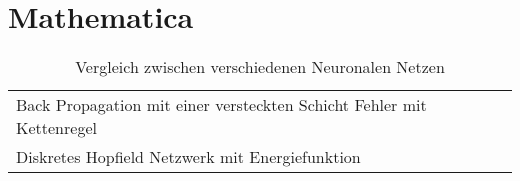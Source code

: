 \section{Mathematica}
\begin{table}[!h]
	\begin{tabularx}{\textwidth}{p{3cm} X}
		Back Propagation mit einer versteckten Schicht Fehler mit Kettenregel &
		\vspace{-5mm}
		 \\
		Diskretes Hopfield Netzwerk mit Energiefunktion &
		\vspace{-5mm}
		
	\end{tabularx}
	\caption{Vergleich zwischen verschiedenen Neuronalen Netzen}
	\label{tab:nnetze}
\end{table}

